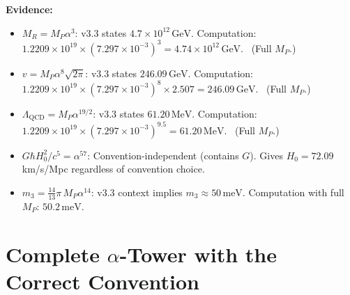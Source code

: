 \documentclass[11pt]{article}
\newcommand{\MP}{M_P}
\newcommand{\GeV}{\,\mathrm{GeV}}
\newcommand{\MeV}{\,\mathrm{MeV}}
\newcommand{\meV}{\,\mathrm{meV}}
\begin{document}
\noindent\textbf{Evidence:}
\begin{itemize}
\item $M_R = \MP\alpha^3$: v3.3 states $4.7 \times 10^{12}\GeV$.
  Computation: $1.2209 \times 10^{19} \times (7.297 \times 10^{-3})^3
  = 4.74 \times 10^{12}\GeV$. \checkmark\ (Full $\MP$.)
\item $v = \MP\alpha^8\sqrt{2\pi}$: v3.3 states $246.09\GeV$.
  Computation: $1.2209 \times 10^{19} \times (7.297 \times 10^{-3})^8
  \times 2.507 = 246.09\GeV$. \checkmark\ (Full $\MP$.)
\item $\Lambda_\mathrm{QCD} = \MP\alpha^{19/2}$: v3.3 states $61.20\MeV$.
  Computation: $1.2209 \times 10^{19} \times (7.297 \times 10^{-3})^{9.5}
  = 61.20\MeV$. \checkmark\ (Full $\MP$.)
\item $G\hbar H_0^2/c^5 = \alpha^{57}$: Convention-independent (contains $G$).
  Gives $H_0 = 72.09$ km/s/Mpc regardless of convention choice.
\item $m_3 = \frac{14}{13}\pi\,\MP\alpha^{14}$: v3.3 context implies
  $m_3 \approx 50\meV$. Computation with full $\MP$: $50.2\meV$. \checkmark
\end{itemize}

\section{Complete $\alpha$-Tower with the Correct Convention}

\begin{tcolorbox}[colback=blue!5!white, colframe=blue!60!black,
  title=\textbf{Convention: $\MP = \sqrt{\hbar c/G} = 1.220890 \times 10^{19}\GeV$ everywhere}]
\end{tcolorbox}

\vspace{0.5cm}
\end{document}
